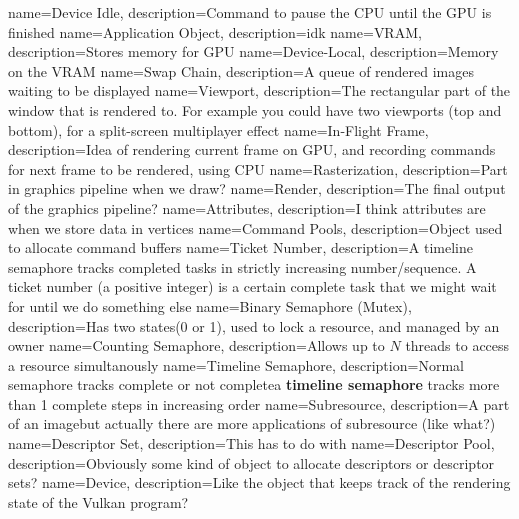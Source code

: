 \documentclass{article}
\begin{document}
{
name={Device Idle},
description={Command to pause the CPU until the GPU is finished}
}
{
name={Application Object},
description={idk}
}
{
name={VRAM},
description={Stores memory for GPU}
}
{
name={Device-Local},
description={Memory on the VRAM}
}
{
name={Swap Chain},
description={A queue of rendered images waiting to be displayed}
}
{
name={Viewport},
description={The rectangular part of the window that is rendered
  to. For example you could have two viewports (top and bottom), for
a split-screen multiplayer effect}
}
{
name={In-Flight Frame},
description={Idea of rendering current frame on GPU, and recording
commands for next frame to be rendered, using CPU}
}
{
name={Rasterization},
description={Part in graphics pipeline when we draw?}
}
{
name={Render},
description={The final output of the graphics pipeline?}
}
{
name={Attributes},
description={I think attributes are when we store data in vertices}
}
{
name={Command Pools},
description={Object used to allocate command buffers}
}
{
name={Ticket Number},
description={A timeline semaphore tracks completed tasks in
  strictly increasing number/sequence. A ticket number (a positive
  integer) is a certain complete task that we might wait for until we
do something else}
}
{
name={Binary Semaphore (Mutex)},
description={Has two states(0 or 1), used to lock a resource, and
managed by an owner}
}
{
name={Counting Semaphore},
description={Allows up to $N$ threads to access a resource simultanously}
}
{
name={Timeline Semaphore},
description={Normal semaphore tracks complete or not
  complete\textemdash a \textbf{timeline semaphore} tracks more than
1 complete steps in increasing order}
}
{
name={Subresource},
description={A part of an image\textemdash but actually there are
more applications of subresource (like what?)}
}
{
name={Descriptor Set},
description={This has to do with }
}
{
name={Descriptor Pool},
description={Obviously some kind of object to allocate descriptors
or descriptor sets?}
}
{
name={Device},
description={Like the object that keeps track of the rendering
state of the Vulkan program?}
}
\end{document}
